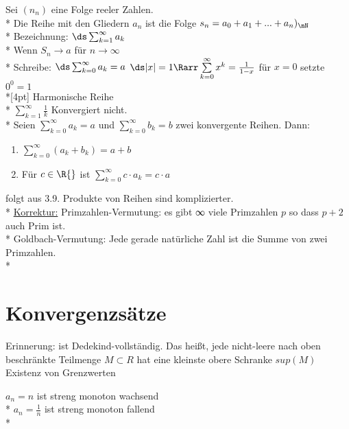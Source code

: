 %
\wdh
Sei $(n_n)$ eine Folge reeler Zahlen.\\*
Die Reihe mit den Gliedern $a_n$ ist die Folge $s_n = a_0 + a_1 + ... + a_n)_\nN$ \\*
Bezeichnung: $\ds\sum_{k=1}^{\infty} a_k$\\*
Wenn $S_n \to a$ für $n \to \infty$\\*
Schreibe: $\ds\sum_{k = 0}^{\infty} a_k = a$
$\ds|x| = 1 \Rarr \sum\limits_{k = 0}^{\infty} x^k = \frac{1}{1-x}$ für $x = 0$ setzte $0^0 = 1$\\*[4pt]
Harmonische Reihe\\*
$\displaystyle\sum\limits_{k = 1}^{\infty} \frac{1}{k}$ Konvergiert nicht.\\*
Seien $\sum\limits_{k = 0}^{\infty} a_k = a$ und $\sum\limits_{k = 0}^{\infty} b_k = b$ zwei konvergente Reihen. Dann:
\begin{enumerate}
\item{$\sum\limits_{k = 0}^{\infty} (a_k + b_k) = a + b$}
\item{Für $c \in \R{}$ ist $\sum\limits_{k = 0}^{\infty} c \cdot a_k = c \cdot a$}
\end{enumerate}
\bew
folgt aus 3.9.
\bem
Produkte von Reihen sind komplizierter.\\*
\ul{Korrektur:}
Primzahlen-Vermutung: es gibt ∞ viele Primzahlen $p$ so dass $p + 2$ auch Prim ist.\\*
Goldbach-Vermutung: Jede gerade natürliche Zahl ist die Summe von zwei Primzahlen.\\*
\chapter{Konvergenzsätze}
Erinnerung: \R{} ist Dedekind-vollständig. Das heißt, jede nicht-leere nach oben beschränkte Teilmenge $M \subset R$ hat eine kleinste obere Schranke $sup(M)$\ \Rarr{} Existenz von Grenzwerten

\bsp
$a_n = n$ ist streng monoton wachsend\\*
$a_n = \frac{1}{n}$ ist streng monoton fallend\\*

